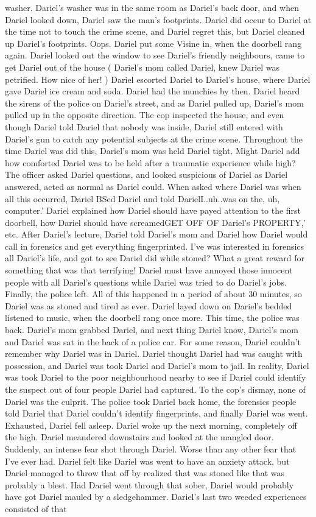 \documentclass[12pt]{book}
\begin{document}
washer. Dariel's washer was in the same room as Dariel's back door, and when Dariel looked down, Dariel saw the man's footprints. Dariel did occur to Dariel at the time not to touch the crime scene, and Dariel regret this, but Dariel cleaned up Dariel's footprints. Oops. Dariel put some Visine in, when the doorbell rang again. Dariel looked out the window to see Dariel's friendly neighbours, came to get Dariel out of the house ( Dariel's mom called Dariel, knew Dariel was petrified. How nice of her! ) Dariel escorted Dariel to Dariel's house, where Dariel gave Dariel ice cream and soda. Dariel had the munchies by then. Dariel heard the sirens of the police on Dariel's street, and as Dariel pulled up, Dariel's mom pulled up in the opposite direction. The cop inspected the house, and even though Dariel told Dariel that nobody was inside, Dariel still entered with Dariel's gun to catch any potential subjects at the crime scene. Throughout the time Dariel was did this, Dariel's mom was held Dariel tight. Might Dariel add how comforted Dariel was to be held after a traumatic experience while high? The officer asked Dariel questions, and looked suspicious of Dariel as Dariel answered, acted as normal as Dariel could. When asked where Dariel was when all this occurred, Dariel BSed Dariel and told DarielI..uh..was on the, uh, computer.' Dariel explained how Dariel should have payed attention to the first doorbell, how Dariel should have screamedGET OFF OF Dariel's PROPERTY,' etc. After Dariel's lecture, Dariel told Dariel's mom and Dariel how Dariel would call in forensics and get everything fingerprinted. I've was interested in forensics all Dariel's life, and got to see Dariel did while stoned? What a great reward for something that was that terrifying! Dariel must have annoyed those innocent people with all Dariel's questions while Dariel was tried to do Dariel's jobs. Finally, the police left. All of this happened in a period of about 30 minutes, so Dariel was as stoned and tired as ever. Dariel layed down on Dariel's bedded listened to music, when the doorbell rang once more. This time, the police was back. Dariel's mom grabbed Dariel, and next thing Dariel know, Dariel's mom and Dariel was sat in the back of a police car. For some reason, Dariel couldn't remember why Dariel was in Dariel. Dariel thought Dariel had was caught with possession, and Dariel was took Dariel and Dariel's mom to jail. In reality, Dariel was took Dariel to the poor neighbourhood nearby to see if Dariel could identify the suspect out of four people Dariel had captured. To the cop's dismay, none of Dariel was the culprit. The police took Dariel back home, the forensics people told Dariel that Dariel couldn't identify fingerprints, and finally Dariel was went. Exhausted, Dariel fell asleep. Dariel woke up the next morning, completely off the high. Dariel meandered downstairs and looked at the mangled door. Suddenly, an intense fear shot through Dariel. Worse than any other fear that I've ever had. Dariel felt like Dariel was went to have an anxiety attack, but Dariel managed to throw that off by realized that was stoned like that was probably a blest. Had Dariel went through that sober, Dariel would probably have got Dariel mauled by a sledgehammer. Dariel's last two weeded experiences consisted of that 
\end{document}
